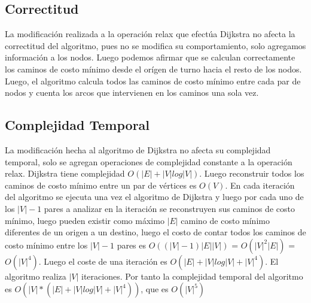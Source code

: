 \documentclass[article]{llncs}
\begin{document}
\subsection{Correctitud}

La modificaci\'on realizada a la operaci\'on relax que efect\'ua Dijkstra no afecta la correctitud 
del algoritmo, pues no se modifica su comportamiento, solo agregamos informaci\'on a los nodos. Luego 
podemos afirmar que se calculan correctamente los caminos de costo m\'inimo desde el or\'igen de turno 
hacia el resto de los nodos. Luego, el algoritmo calcula todos las caminos de costo m\'inimo entre cada 
par de nodos y cuenta los arcos que intervienen en los caminos una sola vez. 

\subsection{Complejidad Temporal}

La modificaci\'on hecha al algoritmo de Dijkstra no afecta su complejidad temporal, solo se agregan operaciones de complejidad 
constante a la operaci\'on relax.
Dijkstra tiene complejidad $O(|E| + |V|log|V|)$. Luego reconstruir todos los caminos de costo m\'inimo 
entre un par de v\'ertices es $O(V)$. En cada iteraci\'on del algoritmo se ejecuta una vez el algoritmo 
de Dijkstra y luego por cada uno de los $|V| - 1$ pares a analizar en la iteraci\'on se reconstruyen sus 
caminos de costo m\'inimo, luego pueden existir como m\'aximo $|E|$ camino de costo m\'inimo diferentes 
de un origen a un destino, luego el costo de contar todos los caminos de costo m\'inimo entre los $|V| - 1$
pares es $O((|V|-1)|E||V|)$ = $O(|V|^2|E|)$ = $O(|V|^4)$. Luego el coste de una iteraci\'on es $O(|E| + |V|log|V| + |V|^4)$. 
El algoritmo realiza $|V|$ iteraciones. Por tanto la complejidad temporal del algoritmo es $O(|V|*(|E| + |V|log|V| + |V|^4))$, 
que es $O(|V|^5)$
\end{document}
